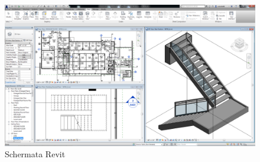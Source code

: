 \begin{figure}[htbp] %
   \centering
   \includegraphics[width=1\linewidth]{images/revit}
   \caption{Schermata Revit}
   \label{fig:revit}
   \end{figure}
   \newpage
